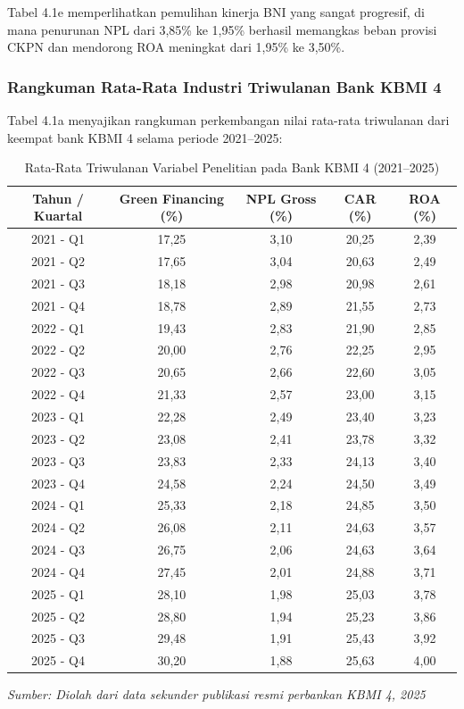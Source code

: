 \documentclass[12pt,a4paper]{article}
\numberwithin{equation}{section}
\begin{document}
\noindent
Tabel 4.1e memperlihatkan pemulihan kinerja BNI yang sangat progresif, di mana penurunan NPL dari 3,85\% ke 1,95\% berhasil memangkas beban provisi CKPN dan mendorong ROA meningkat dari 1,95\% ke 3,50\%.

\subsubsection{Rangkuman Rata-Rata Industri Triwulanan Bank KBMI 4}
\noindent
Tabel 4.1a menyajikan rangkuman perkembangan nilai rata-rata triwulanan dari keempat bank KBMI 4 selama periode 2021--2025:

\begin{table}[H]
  \caption{Rata-Rata Triwulanan Variabel Penelitian pada Bank KBMI 4 (2021--2025)}
  \label{tab:rataan_triwulan}
  \small
  \begin{tabularx}{\textwidth}{|c|c|c|c|c|}
    \hline
    \textbf{Tahun / Kuartal} & \textbf{Green Financing (\%)} & \textbf{NPL Gross (\%)} & \textbf{CAR (\%)} & \textbf{ROA (\%)} \\
    \hline
    2021 - Q1 & 17,25 & 3,10 & 20,25 & 2,39 \\
    2021 - Q2 & 17,65 & 3,04 & 20,63 & 2,49 \\
    2021 - Q3 & 18,18 & 2,98 & 20,98 & 2,61 \\
    2021 - Q4 & 18,78 & 2,89 & 21,55 & 2,73 \\
    \hline
    2022 - Q1 & 19,43 & 2,83 & 21,90 & 2,85 \\
    2022 - Q2 & 20,00 & 2,76 & 22,25 & 2,95 \\
    2022 - Q3 & 20,65 & 2,66 & 22,60 & 3,05 \\
    2022 - Q4 & 21,33 & 2,57 & 23,00 & 3,15 \\
    \hline
    2023 - Q1 & 22,28 & 2,49 & 23,40 & 3,23 \\
    2023 - Q2 & 23,08 & 2,41 & 23,78 & 3,32 \\
    2023 - Q3 & 23,83 & 2,33 & 24,13 & 3,40 \\
    2023 - Q4 & 24,58 & 2,24 & 24,50 & 3,49 \\
    \hline
    2024 - Q1 & 25,33 & 2,18 & 24,85 & 3,50 \\
    2024 - Q2 & 26,08 & 2,11 & 24,63 & 3,57 \\
    2024 - Q3 & 26,75 & 2,06 & 24,63 & 3,64 \\
    2024 - Q4 & 27,45 & 2,01 & 24,88 & 3,71 \\
    \hline
    2025 - Q1 & 28,10 & 1,98 & 25,03 & 3,78 \\
    2025 - Q2 & 28,80 & 1,94 & 25,23 & 3,86 \\
    2025 - Q3 & 29,48 & 1,91 & 25,43 & 3,92 \\
    2025 - Q4 & 30,20 & 1,88 & 25,63 & 4,00 \\
    \hline
  \end{tabularx}
  \begin{flushleft}
    \textit{Sumber: Diolah dari data sekunder publikasi resmi perbankan KBMI 4, 2025}
  \end{flushleft}
\end{table}
\end{document}
